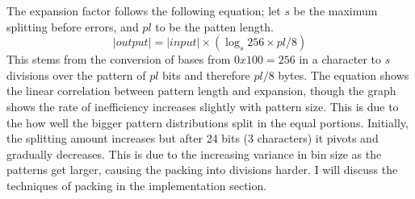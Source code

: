 \documentclass[ %
                    author={Samuel Russell},
                supervisor={Prof. Bogdan Warinschi},
                    degree={MEng},
                     title={Innocuous Ciphertexts},
                  subtitle={The DE-CENSOR Scheme},
                      type={research},
                      year={2018} ]{dissertation}
\begin{document}
%
%

The expansion factor follows the following equation; let $s$ be the maximum splitting before errors, and $pl$ to be the patten length.
$$|output| = |input| \times \left( \log_s 256 \times pl / 8 \right)$$ 
This stems from the conversion of bases from $0x100=256$ in a character to $s$ divisions over the pattern of $pl$ bits and therefore $pl/8$ bytes. The equation shows the linear correlation between pattern length and expansion, though the graph shows the rate of inefficiency increases slightly with pattern size. This is due to the how well the bigger pattern distributions split in the equal portions. Initially, the splitting amount increases but after 24 bits (3 characters) it pivots and gradually decreases.  This is due to the increasing variance in bin size as the patterns get larger, causing the packing into divisions harder. I will discuss the techniques of packing in the implementation section. 
\end{document}
